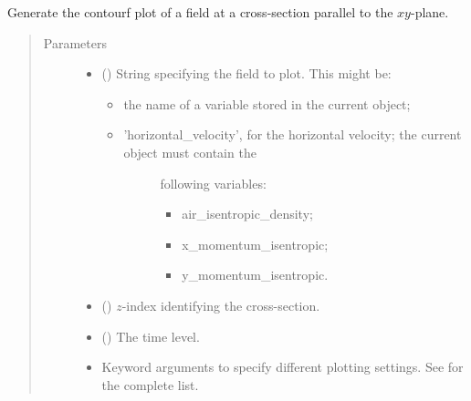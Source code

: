 \documentclass[letterpaper,10pt,english]{sphinxmanual}
\begin{document}
\begin{fulllineitems}
\begin{fulllineitems}
\label{\detokenize{api:storages.state_isentropic.StateIsentropic.contourf_xy}}
Generate the contourf plot of a field at a cross-section parallel to the \(xy\)-plane.
\begin{quote}\begin{description}
\item[{Parameters}] \leavevmode\begin{itemize}
\item {} 
 () \textendash{} 
String specifying the field to plot. This might be:
\begin{itemize}
\item {} 
the name of a variable stored in the current object;

\item {} \begin{description}
\item[{’horizontal\_velocity’, for the horizontal velocity; the current object must contain the}] \leavevmode
following variables:
\begin{itemize}
\item {} 
air\_isentropic\_density;

\item {} 
x\_momentum\_isentropic;

\item {} 
y\_momentum\_isentropic.

\end{itemize}

\end{description}

\end{itemize}


\item {} 
 () \textendash{} \(z\)-index identifying the cross-section.

\item {} 
 () \textendash{} The time level.

\item {} 
 \textendash{} Keyword arguments to specify different plotting settings.
See {\hyperref[\detokenize{api:tasmania.utils.utils_plot.contourf_xy}]{}} for the complete list.


\end{itemize}
\end{description}
\end{quote}
\end{fulllineitems}
\end{fulllineitems}
\end{document}
